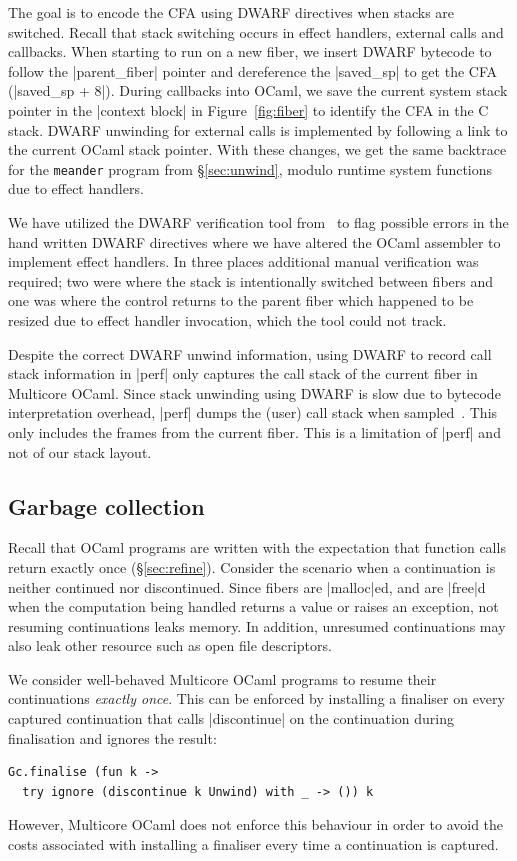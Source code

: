 \documentclass[sigplan,screen]{acmart}
\begin{document}
The goal is to encode the CFA using DWARF directives when stacks are switched.
Recall that stack switching occurs in effect handlers, external calls and
callbacks. When starting to run on a new fiber, we insert DWARF bytecode to
follow the |parent_fiber| pointer and dereference the |saved_sp| to get the CFA
(|saved_sp + 8|). During callbacks into OCaml, we save the current system stack
pointer in the |context block| in Figure~\ref{fig:fiber} to identify the CFA in
the C stack. DWARF unwinding for external calls is implemented by following a
link to the current OCaml stack pointer. With these changes, we get the same
backtrace for the \texttt{meander} program from \S\ref{sec:unwind}, modulo
runtime system functions due to effect handlers.

We have utilized the DWARF verification tool from~\cite{Bastian19} to flag
possible errors in the hand written DWARF directives where we have altered the
OCaml assembler to implement effect handlers. In three places additional manual
verification was required; two were where the stack is intentionally switched
between fibers and one was where the control returns to the parent fiber which
happened to be resized due to effect handler invocation, which the tool could
not track.

Despite the correct DWARF unwind information, using DWARF to record call stack
information in |perf| only captures the call stack of the current fiber in
Multicore OCaml. Since stack unwinding using DWARF is slow due to bytecode
interpretation overhead, |perf| dumps the (user) call stack when
sampled~\cite{Bastian19}. This only includes the frames from the current fiber.
This is a limitation of |perf| and not of our stack layout.

\subsection{Garbage collection}

Recall that OCaml programs are written with the expectation that function calls
return exactly once (\S\ref{sec:refine}). Consider the scenario when a
continuation is neither continued nor discontinued. Since fibers are
|malloc|ed, and are |free|d when the computation being handled returns a value
or raises an exception, not resuming continuations leaks memory. In addition,
unresumed continuations may also leak other resource such as open file
descriptors.

We consider well-behaved Multicore OCaml programs to resume their continuations
\emph{exactly once}. This can be enforced by installing a finaliser on every
captured continuation that calls |discontinue| on the continuation during
finalisation and ignores the result:
\begin{lstlisting}
Gc.finalise (fun k ->
  try ignore (discontinue k Unwind) with _ -> ()) k
\end{lstlisting}
However, Multicore OCaml does not enforce this behaviour in order to avoid the
costs associated with installing a finaliser every time a continuation is
captured.
\end{document}
